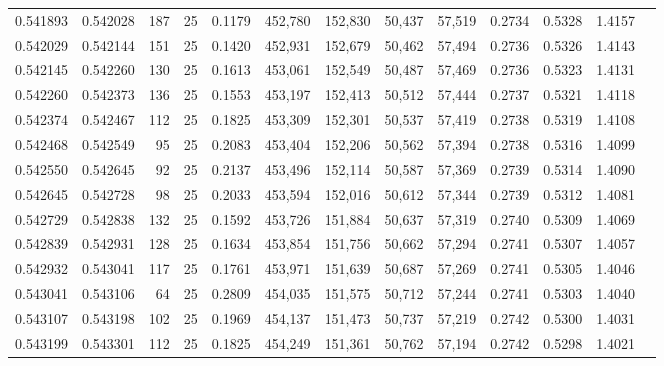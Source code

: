 \begin{tabular}{rrrrrrrrrrrrr}
0.541893 & 0.542028 &   187 &  25 &                                     0.1179 & 452,780 & 152,830 &  50,437 &  57,519 & 0.2734 & 0.5328 & 1.4157 \\
0.542029 & 0.542144 &   151 &  25 &                                     0.1420 & 452,931 & 152,679 &  50,462 &  57,494 & 0.2736 & 0.5326 & 1.4143 \\
0.542145 & 0.542260 &   130 &  25 &                                     0.1613 & 453,061 & 152,549 &  50,487 &  57,469 & 0.2736 & 0.5323 & 1.4131 \\
0.542260 & 0.542373 &   136 &  25 &                                     0.1553 & 453,197 & 152,413 &  50,512 &  57,444 & 0.2737 & 0.5321 & 1.4118 \\
0.542374 & 0.542467 &   112 &  25 &                                     0.1825 & 453,309 & 152,301 &  50,537 &  57,419 & 0.2738 & 0.5319 & 1.4108 \\
0.542468 & 0.542549 &    95 &  25 &                                     0.2083 & 453,404 & 152,206 &  50,562 &  57,394 & 0.2738 & 0.5316 & 1.4099 \\
0.542550 & 0.542645 &    92 &  25 &                                     0.2137 & 453,496 & 152,114 &  50,587 &  57,369 & 0.2739 & 0.5314 & 1.4090 \\
0.542645 & 0.542728 &    98 &  25 &                                     0.2033 & 453,594 & 152,016 &  50,612 &  57,344 & 0.2739 & 0.5312 & 1.4081 \\
0.542729 & 0.542838 &   132 &  25 &                                     0.1592 & 453,726 & 151,884 &  50,637 &  57,319 & 0.2740 & 0.5309 & 1.4069 \\
0.542839 & 0.542931 &   128 &  25 &                                     0.1634 & 453,854 & 151,756 &  50,662 &  57,294 & 0.2741 & 0.5307 & 1.4057 \\
0.542932 & 0.543041 &   117 &  25 &                                     0.1761 & 453,971 & 151,639 &  50,687 &  57,269 & 0.2741 & 0.5305 & 1.4046 \\
0.543041 & 0.543106 &    64 &  25 &                                     0.2809 & 454,035 & 151,575 &  50,712 &  57,244 & 0.2741 & 0.5303 & 1.4040 \\
0.543107 & 0.543198 &   102 &  25 &                                     0.1969 & 454,137 & 151,473 &  50,737 &  57,219 & 0.2742 & 0.5300 & 1.4031 \\
0.543199 & 0.543301 &   112 &  25 &                                     0.1825 & 454,249 & 151,361 &  50,762 &  57,194 & 0.2742 & 0.5298 & 1.4021 \\

\end{tabular}
